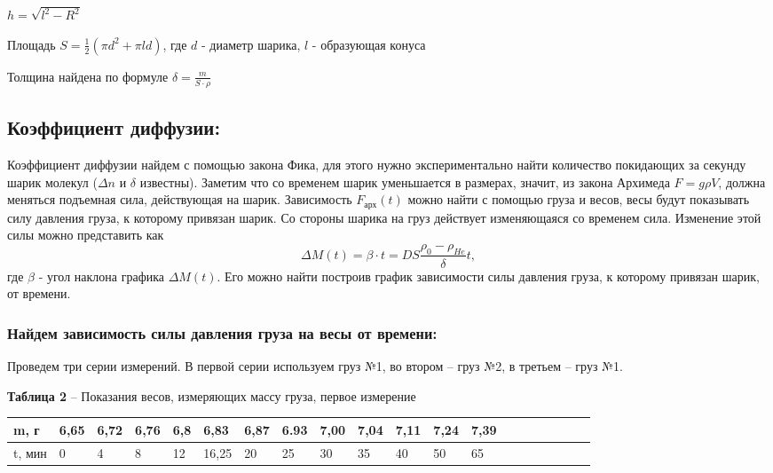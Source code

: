 \documentclass[12pt,a4paper]{article}
\begin{document}
        $h = \sqrt{l^2 - R^2}$
        
        Площадь $S = \frac{1}{2}(\pi d^2 + \pi ld)$, где $d$ - диаметр шарика, $l$ - образующая конуса
        
        Толщина найдена по формуле $\delta = \frac{m}{S \cdot \rho}$


  
    \subsection{Коэффициент диффузии:}
        Коэффициент диффузии найдем с помощью закона Фика, для этого нужно экспериментально найти количество покидающих за секунду шарик молекул ($\Delta n$ и $\delta$ известны). Заметим что со временем шарик уменьшается в размерах, значит, из закона Архимеда $F = g \rho V$, должна меняться подъемная сила, действующая на шарик. Зависимость $F_{\text{арх}}(t)$ можно найти с помощью груза и весов, весы будут показывать силу давления груза, к которому привязан шарик.
        Со стороны шарика на груз действует изменяющаяся со временем сила. Изменение этой  силы можно представить как
        \[
        \Delta M(t) = \beta \cdot t = D S \frac{\rho_0 - \rho_{He}}{\delta} t,
        \]
        где $\beta$ - угол наклона графика $\Delta M(t)$. Его можно найти построив график  зависимости силы давления груза, к которому привязан шарик, от времени.
    \newpage
        \subsubsection{Найдем зависимость силы давления груза на весы от времени:}
        Проведем три серии измерений. В первой серии используем груз №1,  во втором -- груз №2, в третьем -- груз №1.
        \begin{table}[!h]
        \begin{flushleft}
       		\hspace{30}\textbf{Таблица 2} -- Показания весов, измеряющих массу груза, первое измерение \\
        \end{flushleft}
            \begin{center}
                \begin{tabular}{ | l | l | l | l | l | l | l | l | l | l |l | l | l | l | l | l | l | l | l | l |}
                \hline
                m, г    &  6,65    &   6,72    &   6,76    &   6,8 &   6,83    &   6,87     &  6.93    &   7,00    &   7,04    &   7,11    &  7,24     &  7,39 \\
                \hline
                t, мин    &  0       &   4       &   8       &   12  &   16,25   &   20       &   25     &   30      &   35      &   40      &  50       &   65  \\
                \hline                
                \end{tabular}
            \end{center}
        \end{table}
       
\end{document}
